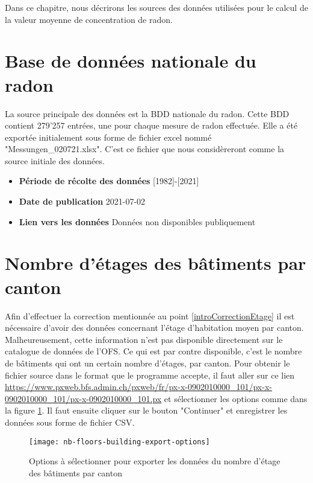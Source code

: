 Dans ce chapitre, nous décrirons les sources des données utilisées pour le calcul de la valeur moyenne de concentration de radon.

\section{Base de données nationale du radon}
La source principale des données est la BDD nationale du radon. Cette BDD contient 279'257 entrées, une pour chaque mesure de radon effectuée.
Elle a été exportée initialement sous forme de fichier excel nommé "Messungen\_020721.xlsx". C'est ce fichier que nous considèreront comme la source initiale des données. %

\begin{itemize}
\item \textbf{Période de récolte des données} [1982]-[2021] %
\item \textbf{Date de publication} 2021-07-02
\item \textbf{Lien vers les données} Données non disponibles publiquement
\end{itemize}

\section{Nombre d'étages des bâtiments par canton}\label{sectionCantonEtagesBatiments}
Afin d'effectuer la correction mentionnée au point \ref{introCorrectionEtage} il est nécessaire d'avoir des données concernant l'étage d'habitation moyen par canton. Malheureusement, cette information n'est pas disponible directement sur le catalogue de données de l'OFS. Ce qui est par contre disponible, c'est le nombre de bâtiments qui ont un certain nombre d'étages, par canton. Pour obtenir le fichier source dans le format que le programme accepte, il faut aller sur ce lien \url{https://www.pxweb.bfs.admin.ch/pxweb/fr/px-x-0902010000_101/px-x-0902010000_101/px-x-0902010000_101.px} et sélectionner les options comme dans la figure \ref{fig:nbFloorsBuildingExportOptions}. Il faut ensuite cliquer sur le bouton "Continuer" et enregistrer les données sous forme de fichier CSV.

\begin{figure}[H]
    \centering
    \texttt{[image: nb-floors-building-export-options]}
    \caption{Options à sélectionner pour exporter les données du nombre d'étage des bâtiments par canton}
    \label{fig:nbFloorsBuildingExportOptions}
\end{figure}

